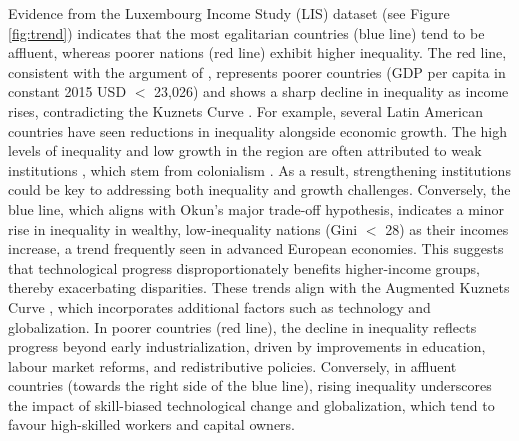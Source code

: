 Evidence from the Luxembourg Income Study (LIS) dataset (see Figure \ref{fig:trend}) indicates that the most egalitarian countries (blue line) tend to be affluent, whereas poorer nations (red line) exhibit higher inequality. The red line, consistent with the argument of \textcite{berg2017inequality}, represents poorer countries (GDP per capita in constant 2015 USD $<$ 23,026) and shows a sharp decline in inequality as income rises, contradicting the Kuznets Curve \parencite*{kuznets1955economic}. For example, several Latin American countries have seen reductions in inequality alongside economic growth. The high levels of inequality and low growth in the region are often attributed to weak institutions \parencite{undp2021trapped}, which stem from colonialism \parencite{coatsworth2008inequality}. As a result, strengthening institutions could be key to addressing both inequality and growth challenges. Conversely, the blue line, which aligns with Okun’s major trade-off hypothesis, indicates a minor rise in inequality in wealthy, low-inequality nations (Gini $<$ 28) as their incomes increase, a trend frequently seen in advanced European economies. This suggests that technological progress disproportionately benefits higher-income groups, thereby exacerbating disparities. These trends align with the Augmented Kuznets Curve \parencite*{conceicao2001toward}, which incorporates additional factors such as technology and globalization. In poorer countries (red line), the decline in inequality reflects progress beyond early industrialization, driven by improvements in education, labour market reforms, and redistributive policies. Conversely, in affluent countries (towards the right side of the blue line), rising inequality underscores the impact of skill-biased technological change and globalization, which tend to favour high-skilled workers and capital owners.

